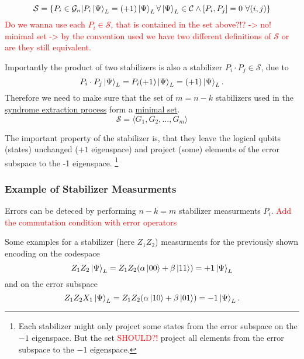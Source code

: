 \begin{equation}
    \mathcal{S} = \{ P_i \in \mathcal{G}_n | P_i \ket{\Psi}_L = (+1) \ket{\Psi}_L \forall \ket{\Psi}_L\in \mathcal{C} \land [P_i,P_j]=0 \ \forall(i,j)\}
\end{equation}
\textcolor{red}{Do we wanna use each $P_i \in \mathcal{S}$, that is contained in the set above?!? -> no! minimal set -> by the convention used we have two different definitions of $\mathcal{S}$ or are they still equivalent.}

Importantly the product of two stabilizers is also a stabilizer $P_i \cdot P_j \in \mathcal{S}$, due to
\begin{equation}
    P_i \cdot P_j  \ket{\Psi}_L = P_i (+1) \ket{\Psi}_L = (+1) \ket{\Psi}_L.
\end{equation}
Therefore we need to make sure that the set of $m=n-k$ stabilizers used in the \hyperref[sec:basic.qc.syndrome_extraction_process]{syndrome extraction process}
form a \hyperref[sec:basic.math.minimal_set]{minimal set}. 
\begin{equation}
    \mathcal{S}= \langle G_1, G_2, ..., G_m\rangle
\end{equation}

The important property of the stabilizer is, that they leave the logical qubits (states) unchanged ($+1$ eigenspace) 
and project (some) elements of the error subspace to the -1 eigenspace.
\footnote{
    Each stabilizer might only project some states from the error subspace on the $-1$ eigenspace. 
    But the set \textcolor{red}{SHOULD?!} project all elements from the error subspace to the $-1$ eigenspace. 
} 


\subsubsection{Example of Stabilizer Measurments}
Errors can be deteced by performing $n-k=m$ stabilizer measurments $P_i$.
\textcolor{red}{Add the commutation condition with error operators}

Some examples for a stabilizer (here $Z_1 Z_2$) measurments for the previously shown encoding on the codespace
\begin{equation}
    Z_1 Z_2 \ket{\Psi}_L = Z_1 Z_2 (\alpha \ket{00}+ \beta \ket{11}) = +1 \ket{\Psi}_L
\end{equation}
and on the error subspace
\begin{equation}
    Z_1 Z_2 X_1\ket{\Psi}_L = Z_1 Z_2 (\alpha \ket{10}+ \beta \ket{01}) = -1 \ket{\Psi}_L.
\end{equation}

